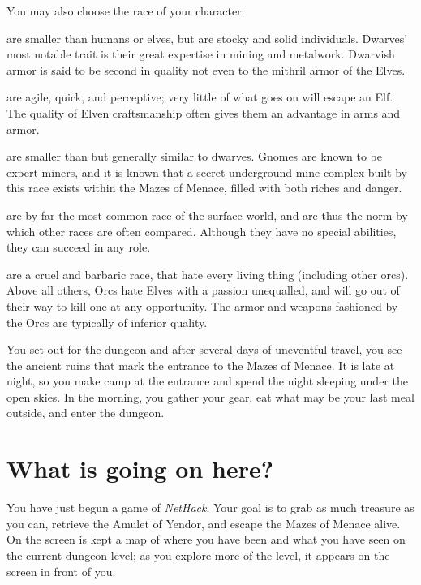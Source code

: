 You may also choose the race of your character:

%
\blist{}
\item[\bb{Dwarves}]%
are smaller than humans or elves, but are stocky and solid
individuals.  Dwarves' most notable trait is their great expertise in mining
and metalwork.  Dwarvish armor is said to be second in quality not even to the
mithril armor of the Elves.
%
\item[\bb{Elves}]%
are agile, quick, and perceptive; very little of what goes
on will escape an Elf.  The quality of Elven craftsmanship often gives
them an advantage in arms and armor.
%
\item[\bb{Gnomes}]%
are smaller than but generally similar to dwarves.  Gnomes are
known to be expert miners, and it is known that a secret underground mine
complex built by this race exists within the Mazes of Menace, filled with
both riches and danger.
%
\item[\bb{Humans}]%
are by far the most common race of the surface world, and
are thus the norm by which other races are often compared.  Although
they have no special abilities, they can succeed in any role.
%
\item[\bb{Orcs}]%
are a cruel and barbaric race, that hate every living thing
(including other orcs).  Above all others, Orcs hate Elves with a passion
unequalled, and will go out of their way to kill one at any opportunity.
The armor and weapons fashioned by the Orcs are typically of inferior quality.
\elist

\nd You set out for the dungeon and after several days of uneventful
travel, you see the ancient ruins that mark the entrance to the Mazes
of Menace.  It is late at night, so you make camp at the entrance and
spend the night sleeping under the open skies.  In the morning, you
gather your gear, eat what may be your last meal outside, and enter
the dungeon.

\section{What is going on here?}

You have just begun a game of {\it NetHack}.  Your goal is to grab as much
treasure as you can, retrieve the Amulet of Yendor, and escape the
Mazes of Menace alive.  On the screen is kept a map of where you have
been and what you have seen on the current dungeon level; as you
explore more of the level, it appears on the screen in front of you.

